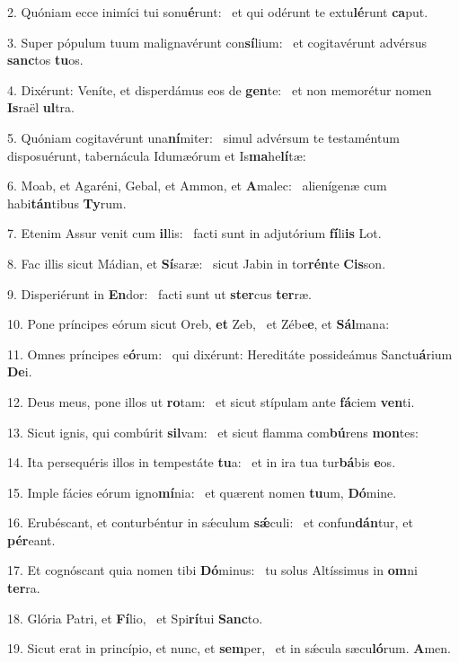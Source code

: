 2. Quóniam ecce inimíci tui sonu\textbf{é}runt: \ast\  et qui odérunt te extu\textbf{lé}runt \textbf{ca}put.\

3. Super pópulum tuum malignavérunt con\textbf{sí}lium: \ast\  et cogitavérunt advérsus \textbf{sanc}tos \textbf{tu}os.\

4. Dixérunt: Veníte, et disperdámus eos de \textbf{gen}te: \ast\  et non memorétur nomen \textbf{Is}raël \textbf{ul}tra.\

5. Quóniam cogitavérunt una\textbf{ní}miter: \ast\  simul advérsum te testaméntum disposuérunt, tabernácula Idumæórum et Is\textbf{ma}he\textbf{lí}tæ:\

6. Moab, et Agaréni, Gebal, et Ammon, et \textbf{A}malec: \ast\  alienígenæ cum habi\textbf{tán}tibus \textbf{Ty}rum.\

7. Etenim Assur venit cum \textbf{il}lis: \ast\  facti sunt in adjutórium \textbf{fí}li\textbf{is} Lot.\

8. Fac illis sicut Mádian, et \textbf{Sí}saræ: \ast\  sicut Jabin in tor\textbf{rén}te \textbf{Cis}son.\

9. Disperiérunt in \textbf{En}dor: \ast\  facti sunt ut \textbf{ster}cus \textbf{ter}ræ.\

10. Pone príncipes eórum sicut Oreb, \textbf{et} Zeb, \ast\  et Zébe\textbf{e}, et \textbf{Sál}mana:\

11. Omnes príncipes e\textbf{ó}rum: \ast\  qui dixérunt: Hereditáte possideámus Sanctu\textbf{á}rium \textbf{De}i.\

12. Deus meus, pone illos ut \textbf{ro}tam: \ast\  et sicut stípulam ante \textbf{fá}ciem \textbf{ven}ti.\

13. Sicut ignis, qui combúrit \textbf{sil}vam: \ast\  et sicut flamma com\textbf{bú}rens \textbf{mon}tes:\

14. Ita persequéris illos in tempestáte \textbf{tu}a: \ast\  et in ira tua tur\textbf{bá}bis \textbf{e}os.\

15. Imple fácies eórum igno\textbf{mí}nia: \ast\  et quærent nomen \textbf{tu}um, \textbf{Dó}mine.\

16. Erubéscant, et conturbéntur in sǽculum \textbf{sǽ}culi: \ast\  et confun\textbf{dán}tur, et \textbf{pér}eant.\

17. Et cognóscant quia nomen tibi \textbf{Dó}minus: \ast\  tu solus Altíssimus in \textbf{om}ni \textbf{ter}ra.\

18. Glória Patri, et \textbf{Fí}lio, \ast\  et Spi\textbf{rí}tui \textbf{Sanc}to.\

19. Sicut erat in princípio, et nunc, et \textbf{sem}per, \ast\  et in sǽcula sæcu\textbf{ló}rum. \textbf{A}men.\

